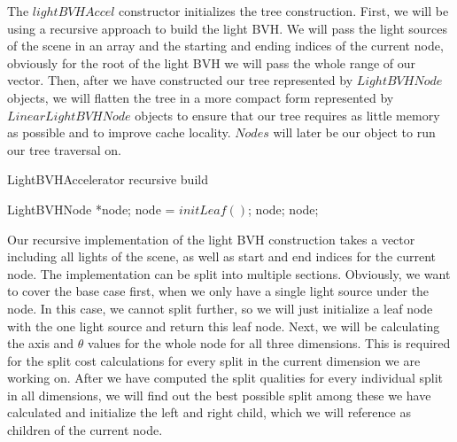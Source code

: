 The $lightBVHAccel$ constructor initializes the tree construction. First, we will be using a recursive approach to build the light BVH. We will pass the light sources of the scene in an array and the starting and ending indices of the current node, obviously for the root of the light BVH we will pass the whole range of our vector. Then, after we have constructed our tree represented by $LightBVHNode$ objects, we will flatten the tree in a more compact form represented by $LinearLightBVHNode$ objects to ensure that our tree requires as little memory as possible and to improve cache locality. $Nodes$ will later be our object to run our tree traversal on.

\begin{algorithm}
	\caption{LightBVHAccelerator recursive build}
	\label{recursiveBuild}
	\begin{algorithmic}[1] %
		\State LightBVHNode *node;
			\State *node = $initLeaf()$;
			\State \Return node;
		\EndIf
        	\State <calculate axis and thetas for the whole node for current dimension>
			\State <calculate all split costs for current dimension>
		\EndFor
		\State <find out best split>
		\State <initialize child nodes and make reference as children>
		\State \Return node;
		\EndProcedure
	\end{algorithmic}
\end{algorithm}

Our recursive implementation of the light BVH construction takes a vector including all lights of the scene, as well as start and end indices for the current node. The implementation can be split into multiple sections. Obviously, we want to cover the base case first, when we only have a single light source under the node. In this case, we cannot split further, so we will just initialize a leaf node with the one light source and return this leaf node. Next, we will be calculating the axis and $\theta$ values for the whole node for all three dimensions. This is required for the split cost calculations for every split in the current dimension we are working on. After we have computed the split qualities for every individual split in all dimensions, we will find out the best possible split among these we have calculated and initialize the left and right child, which we will reference as children of the current node.

